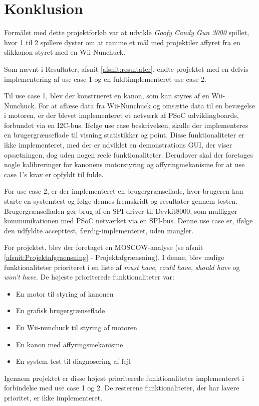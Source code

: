 \chapter{Konklusion}
Formålet med dette projektforløb var at udvikle \textit{Goofy Candy Gun 3000} spillet, hvor 1 til 2 spillere dyster om at ramme et mål med projektiler affyret fra en slikkanon styret med en Wii-Nunchuck. \newline

\noindent Som nævnt i Resultater, afsnit \ref{afsnit:resultater}, endte projektet med en delvis implementering af use case 1 og en fuldtimplementeret use case 2. \newline

\noindent Til use case 1, blev der konstrueret en kanon, som kan styres af en Wii-Nunchuck. For at aflæse data fra Wii-Nunchuck og omsætte data til en bevægelse i motoren, er der blevet implementeret et netværk af PSoC udviklingboards, forbundet via en I2C-bus. Ifølge use case beskrivelsen, skulle der implementeres en brugergrænseflade til visning statistikker og point. Disse funktionaliteter er ikke implementeret, med der er udviklet en demonstrations GUI, der viser opsætningen, dog uden nogen reele funktionaliteter.  
\noindent Derudover skal der foretages nogle kalibreringer for kanonens motorstyring og affyringmekanisme for at use case 1's krav er opfyldt til fulde.\newline 

\noindent For use case 2, er der implementeret en brugergrænseflade, hvor brugeren kan starte en systemtest og følge dennes fremskridt og resultater gennem testen. Brugergrænsefladen gør brug af en SPI-driver til Devkit8000, som mulliggør kommunikationen med PSoC netværket via en SPI-bus. Denne use case er, ifølge den udfyldte accepttest, færdig-implementeret, uden mangler. \newline

\noindent For projektet, blev der foretaget en MOSCOW-analyse (se afsnit \ref{afsnit:Projektafgraensning} - Projektafgrænsning). I denne, blev mulige funktionaliteter prioriteret i en liste af \textit{must have}, \textit{could have}, \textit{should have} og \textit{won't have}. De højeste prioriterede funktionaliteter var:

\begin{itemize}
	\item En motor til styring af kanonen
	\item En grafisk brugergrænseflade
	\item En Wii-nunchuck til styring af motoren
	\item En kanon med affyringsmekanisme
	\item En system test til diagnosering af fejl
\end{itemize}
\noindent Igennem projektet er disse højest prioriterede funktionaliteter implementeret i forbindelse med use case 1 og 2. De resterene funktionaliteter, der har lavere prioritet, er ikke implementeret.